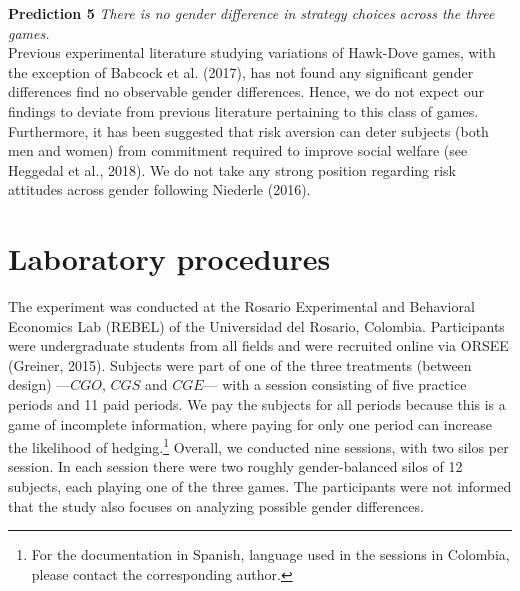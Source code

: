 \documentclass[11pt, letterpaper]{article}
\theoremstyle{plain}
\begin{document}
\noindent \textbf{Prediction 5}
\textit{There is no gender difference in strategy choices across the three games.}\\

Previous experimental literature studying variations of Hawk-Dove games, with the exception of Babcock et al. (2017), has not found any significant gender differences find no observable gender differences. Hence, we do not expect our findings to deviate from previous literature pertaining to this class of games. Furthermore, it has been suggested that risk aversion can deter subjects (both men and women) from commitment required to improve social welfare (see Heggedal et al., 2018). We do not take any strong position regarding risk attitudes across gender following Niederle (2016). 


\section{Laboratory procedures}
\label{sec:game}

The experiment was conducted at the Rosario Experimental and Behavioral Economics Lab (REBEL) of the Universidad del Rosario, Colombia. Participants were undergraduate students from all fields and were recruited online via ORSEE (Greiner, 2015). Subjects were part of one of the three treatments (between design) ---$CGO$, $CGS$ and $CGE$---  with  a session consisting of five practice periods and 11 paid periods. We pay the subjects for all periods because this is a game of incomplete information, where paying for only one period can increase the likelihood of hedging.\footnote{For the documentation in Spanish, language used in the sessions in Colombia, please contact the corresponding author.} Overall, we conducted nine sessions, with two silos per session. In each session there were two roughly gender-balanced silos of 12 subjects, each playing one of the three games. The participants were not informed that the study also focuses on analyzing possible gender differences.
\end{document}
